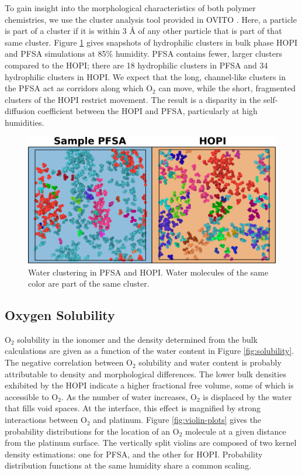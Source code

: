 \documentclass[journal=jacsat,manuscript=article]{achemso}
\begin{document}
To gain insight into the morphological characteristics of both polymer chemistries, we use the cluster analysis tool provided in OVITO \cite{stukowski_visualization_2009}. Here, a particle is part of a cluster if it is within 3 {\AA} of any other particle that is part of that same cluster. Figure \ref{fig:clustering} gives snapshots of hydrophilic clusters in bulk phase HOPI and PFSA simulations at 85\% humidity. PFSA contains fewer, larger clusters compared to the HOPI; there are 18 hydrophilic clusters in PFSA and 34 hydrophilic clusters in HOPI. We expect that the long, channel-like clusters in the PFSA act as corridors along which O$_2$ can move, while the short, fragmented clusters of the HOPI restrict movement. The result is a disparity in the self-diffusion coefficient between the HOPI and PFSA, particularly at high humidities. 
\begin{figure}[h!]
  \includegraphics[width=.9\linewidth]{clustering.png}
  \centering
  \caption{Water clustering in PFSA and HOPI. Water molecules of the same color are part of the same cluster.}
  \label{fig:clustering}
\end{figure}

\subsection{Oxygen Solubility}
O$_2$ solubility in the ionomer and the density determined from the bulk calculations are given as a function of the water content in Figure \ref{fig:solubility}. The negative correlation between O$_2$ solubility and water content is probably attributable to density and morphological differences. The lower bulk densities exhibited by the HOPI indicate a higher fractional free volume, some of which is accessible to O$_2$. As the number of water increases, O$_2$ is displaced by the water that fills void spaces. At the interface, this effect is magnified by strong interactions between O$_2$ and platinum. Figure \ref{fig:violin-plots} gives the probability distributions for the location of an O$_2$ molecule at a given distance from the platinum surface. The vertically split violins are composed of two kernel density estimations: one for PFSA, and the other for HOPI.  Probability distribution functions at the same humidity share a common scaling. 
\end{document}
